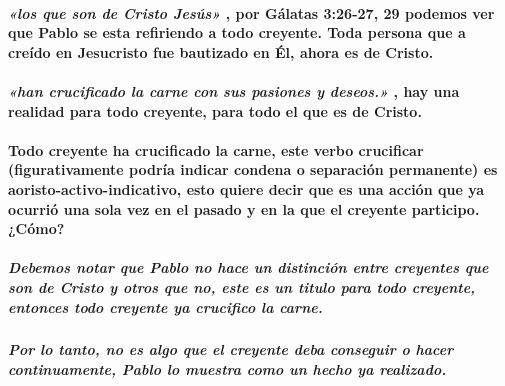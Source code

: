 \documentclass[11a pt,twoside]{article}
\newcommand{\scripture}[1]{%
  {\fontsize{12pt}{16pt}\selectfont\ScriptureFont\itshape #1}%
}
\def\textbf#1{#1}%
\let\oldparagraph\paragraph
\renewcommand{\paragraph}{\needspace{3\baselineskip}\oldparagraph}
\let\oldsubparagraph\subparagraph
\renewcommand{\subparagraph}{\needspace{2\baselineskip}\oldsubparagraph}
\begin{document}
\paragraph{\texorpdfstring{\scripture{«los que son de Cristo Jesús»},
por Gálatas 3:26-27, 29 podemos ver que Pablo se esta refiriendo a todo
creyente. Toda persona que a creído en Jesucristo fue bautizado en Él,
ahora es \textbf{de
Cristo}.}{, por Gálatas 3:26-27, 29 podemos ver que Pablo se esta refiriendo a todo creyente. Toda persona que a creído en Jesucristo fue bautizado en Él, ahora es de Cristo.}}\label{los-que-son-de-cristo-jesuxfas-por-guxe1latas-326-27-29-podemos-ver-que-pablo-se-esta-refiriendo-a-todo-creyente.-toda-persona-que-a-creuxeddo-en-jesucristo-fue-bautizado-en-uxe9l-ahora-es-de-cristo.}

\paragraph{\texorpdfstring{\scripture{«han crucificado la carne con sus pasiones y deseos.»},
hay una realidad para todo creyente, para todo el que es de
Cristo.}{, hay una realidad para todo creyente, para todo el que es de Cristo.}}\label{han-crucificado-la-carne-con-sus-pasiones-y-deseos.-hay-una-realidad-para-todo-creyente-para-todo-el-que-es-de-cristo.}

\paragraph{Todo creyente ha crucificado la carne, este verbo crucificar
(figurativamente podría indicar condena o separación permanente) es
aoristo-activo-indicativo, esto quiere decir que es una acción que ya
ocurrió una sola vez en el pasado y en la que el creyente participo.
¿Cómo?}\label{todo-creyente-ha-crucificado-la-carne-este-verbo-crucificar-figurativamente-podruxeda-indicar-condena-o-separaciuxf3n-permanente-es-aoristo-activo-indicativo-esto-quiere-decir-que-es-una-acciuxf3n-que-ya-ocurriuxf3-una-sola-vez-en-el-pasado-y-en-la-que-el-creyente-participo.-cuxf3mo}

\subparagraph{Debemos notar que Pablo no hace un distinción entre
creyentes que son de Cristo y otros que no, este es un titulo para todo
creyente, entonces todo creyente ya crucifico la
carne.}\label{debemos-notar-que-pablo-no-hace-un-distinciuxf3n-entre-creyentes-que-son-de-cristo-y-otros-que-no-este-es-un-titulo-para-todo-creyente-entonces-todo-creyente-ya-crucifico-la-carne.}

\subparagraph{Por lo tanto, no es algo que el creyente deba conseguir o
hacer continuamente, Pablo lo muestra como un hecho ya
realizado.}\label{por-lo-tanto-no-es-algo-que-el-creyente-deba-conseguir-o-hacer-continuamente-pablo-lo-muestra-como-un-hecho-ya-realizado.}
\end{document}
